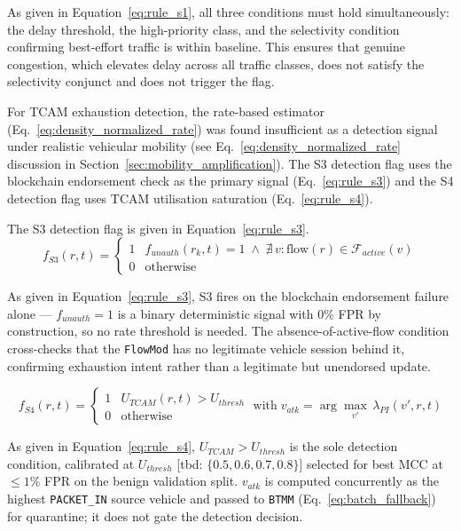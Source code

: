 \documentclass[12pt, a4paper]{report}
\begin{document}
As given in Equation~\eqref{eq:rule_s1}, all three
conditions must hold simultaneously: the delay
threshold, the high-priority class, and the selectivity
condition confirming best-effort traffic is within
baseline. This ensures that genuine congestion, which
elevates delay across all traffic classes, does not
satisfy the selectivity conjunct and does not trigger
the flag.

For \ac{TCAM} exhaustion detection, the rate-based
estimator (Eq.~\ref{eq:density_normalized_rate}) was
found insufficient as a detection signal under
realistic vehicular mobility (see
Eq.~\ref{eq:density_normalized_rate} discussion in
Section~\ref{sec:mobility_amplification}). The S3
detection flag uses the blockchain endorsement check
as the primary signal
(Eq.~\ref{eq:rule_s3}) and the S4 detection flag
uses \ac{TCAM} utilisation saturation
(Eq.~\ref{eq:rule_s4}).

The S3 detection flag is given in
Equation~\eqref{eq:rule_s3}.
\begin{equation}
f_{S3}(r,t) =
\begin{cases}
1 & f_{unauth}(r_k,t) = 1
    \;\land\; \nexists\,v :
    \text{flow}(r) \in \mathcal{F}_{active}(v) \\
0 & \text{otherwise}
\end{cases}
\label{eq:rule_s3}
\end{equation}

As given in Equation~\eqref{eq:rule_s3}, S3 fires on
the blockchain endorsement failure alone ---
$f_{unauth}{=}1$ is a binary deterministic signal with
0\% \ac{FPR} by construction, so no rate threshold is
needed. The absence-of-active-flow condition cross-checks
that the \texttt{FlowMod} has no legitimate vehicle
session behind it, confirming exhaustion intent rather
than a legitimate but unendorsed update.


\begin{equation}
f_{S4}(r,t) =
\begin{cases}
1 & U_{TCAM}(r,t) > U_{thresh} \\
0 & \text{otherwise}
\end{cases}
\;\text{with}\;
v_{atk} = \arg\max_{v'}\,\lambda_{PI}(v',r,t)
\label{eq:rule_s4}
\end{equation}

As given in Equation~\eqref{eq:rule_s4}, $U_{TCAM}>
U_{thresh}$ is the sole detection condition, calibrated
at $U_{thresh}$ [tbd: $\{0.5, 0.6, 0.7, 0.8\}$]
selected for best \ac{MCC} at $\leq 1\%$ \ac{FPR} on
the benign validation split. $v_{atk}$ is computed
concurrently as the highest \texttt{PACKET\_IN} source
vehicle and passed to \texttt{BTMM}
(Eq.~\ref{eq:batch_fallback}) for quarantine; it does
not gate the detection decision.
\end{document}

